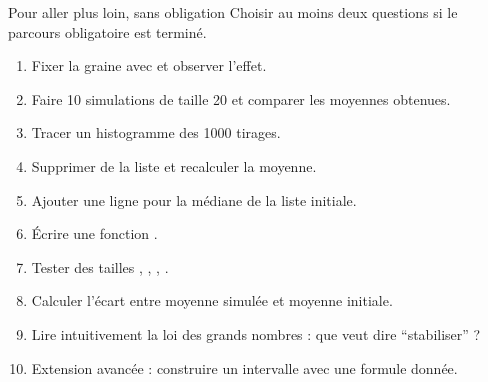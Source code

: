 \documentclass[11pt,a4paper]{article}
\begin{document}
\begin{extensionexercise}{Pour aller plus loin, sans obligation}
Choisir au moins deux questions si le parcours obligatoire est terminé.
\begin{enumerate}
  \item Fixer la graine avec  et observer l'effet.
  \item Faire 10 simulations de taille 20 et comparer les moyennes obtenues.
  \item Tracer un histogramme des 1000 tirages.
  \item Supprimer  de la liste et recalculer la moyenne.
  \item Ajouter une ligne pour la médiane de la liste initiale.
  \item Écrire une fonction .
  \item Tester des tailles , , , .
  \item Calculer l'écart entre moyenne simulée et moyenne initiale.
  \item Lire intuitivement la loi des grands nombres : que veut dire “stabiliser” ?
  \item Extension avancée : construire un intervalle  avec une formule donnée.
\end{enumerate}
\end{extensionexercise}
\end{document}
